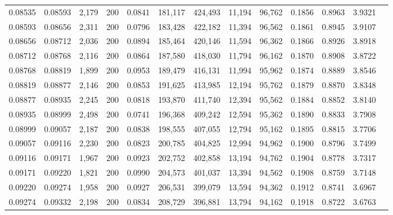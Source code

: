 \begin{tabular}{rrrrrrrrrrrrr}
0.08535 & 0.08593 & 2,179 & 200 &                                     0.0841 & 181,117 & 424,493 &  11,194 &  96,762 & 0.1856 & 0.8963 & 3.9321 \\
0.08593 & 0.08656 & 2,311 & 200 &                                     0.0796 & 183,428 & 422,182 &  11,394 &  96,562 & 0.1861 & 0.8945 & 3.9107 \\
0.08656 & 0.08712 & 2,036 & 200 &                                     0.0894 & 185,464 & 420,146 &  11,594 &  96,362 & 0.1866 & 0.8926 & 3.8918 \\
0.08712 & 0.08768 & 2,116 & 200 &                                     0.0864 & 187,580 & 418,030 &  11,794 &  96,162 & 0.1870 & 0.8908 & 3.8722 \\
0.08768 & 0.08819 & 1,899 & 200 &                                     0.0953 & 189,479 & 416,131 &  11,994 &  95,962 & 0.1874 & 0.8889 & 3.8546 \\
0.08819 & 0.08877 & 2,146 & 200 &                                     0.0853 & 191,625 & 413,985 &  12,194 &  95,762 & 0.1879 & 0.8870 & 3.8348 \\
0.08877 & 0.08935 & 2,245 & 200 &                                     0.0818 & 193,870 & 411,740 &  12,394 &  95,562 & 0.1884 & 0.8852 & 3.8140 \\
0.08935 & 0.08999 & 2,498 & 200 &                                     0.0741 & 196,368 & 409,242 &  12,594 &  95,362 & 0.1890 & 0.8833 & 3.7908 \\
0.08999 & 0.09057 & 2,187 & 200 &                                     0.0838 & 198,555 & 407,055 &  12,794 &  95,162 & 0.1895 & 0.8815 & 3.7706 \\
0.09057 & 0.09116 & 2,230 & 200 &                                     0.0823 & 200,785 & 404,825 &  12,994 &  94,962 & 0.1900 & 0.8796 & 3.7499 \\
0.09116 & 0.09171 & 1,967 & 200 &                                     0.0923 & 202,752 & 402,858 &  13,194 &  94,762 & 0.1904 & 0.8778 & 3.7317 \\
0.09171 & 0.09220 & 1,821 & 200 &                                     0.0990 & 204,573 & 401,037 &  13,394 &  94,562 & 0.1908 & 0.8759 & 3.7148 \\
0.09220 & 0.09274 & 1,958 & 200 &                                     0.0927 & 206,531 & 399,079 &  13,594 &  94,362 & 0.1912 & 0.8741 & 3.6967 \\
0.09274 & 0.09332 & 2,198 & 200 &                                     0.0834 & 208,729 & 396,881 &  13,794 &  94,162 & 0.1918 & 0.8722 & 3.6763 \\

\end{tabular}
